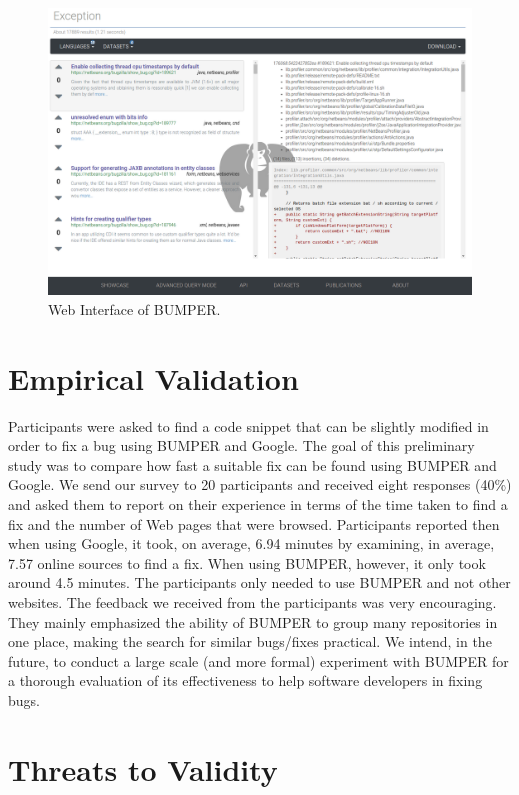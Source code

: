 \documentclass[12pt]{report}
\begin{document}
\begin{figure}[h]
  \centering
    \includegraphics[scale=0.30]{media/bumper-live.png}
    \caption{Web Interface of BUMPER.
    \label{fig:bumper-ui}}
\end{figure}

\section{Empirical Validation}\label{empirical-validation}

Participants were asked to find a code snippet that can be slightly
modified in order to fix a bug using BUMPER and Google. The goal of this
preliminary study was to compare how fast a suitable fix can be found
using BUMPER and Google. We send our survey to 20 participants and
received eight responses (40\%) and asked them to report on their
experience in terms of the time taken to find a fix and the number of
Web pages that were browsed. Participants reported then when using
Google, it took, on average, 6.94 minutes by examining, in average, 7.57
online sources to find a fix. When using BUMPER, however, it only took
around 4.5 minutes. The participants only needed to use BUMPER and not
other websites. The feedback we received from the participants was very
encouraging. They mainly emphasized the ability of BUMPER to group many
repositories in one place, making the search for similar bugs/fixes
practical. We intend, in the future, to conduct a large scale (and more
formal) experiment with BUMPER for a thorough evaluation of its
effectiveness to help software developers in fixing bugs.

\section{Threats to Validity}\label{threats-to-validity}
\end{document}
